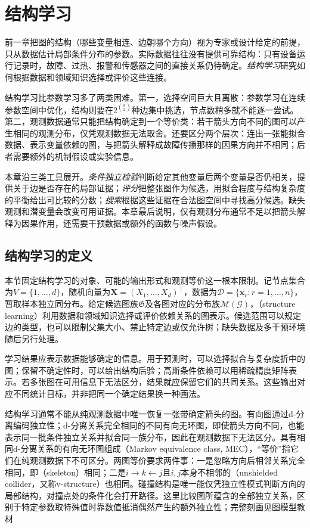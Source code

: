 \chapter{结构学习}
\label{chap:pgm-structure-learning}

前一章把图的结构（哪些变量相连、边朝哪个方向）视为专家或设计给定的前提，只从数据估计局部条件分布的参数。实际数据往往没有提供可靠结构：只有设备运行记录时，故障、过热、报警和传感器之间的直接关系仍待确定。\emph{结构学习}研究如何根据数据和领域知识选择或评价这些连接。

结构学习比参数学习多了两类困难。第一，选择空间巨大且离散：参数学习在连续参数空间中优化，结构则要在$2^{\binom d2}$种边集中挑选，节点数稍多就不能逐一尝试。第二，观测数据通常只能把结构确定到一个等价类：若干箭头方向不同的图可以产生相同的观测分布，仅凭观测数据无法取舍。还要区分两个层次：连出一张能拟合数据、表示变量依赖的图，与把箭头解释成故障传播那样的因果方向并不相同；后者需要额外的机制假设或实验信息。

本章沿三类工具展开。\emph{条件独立检验}判断给定其他变量后两个变量是否仍相关，提供关于边是否存在的局部证据；\emph{评分}把整张图作为候选，用拟合程度与结构复杂度的平衡给出可比较的分数；\emph{搜索}根据这些证据在合法图空间中寻找高分候选。缺失观测和潜变量会改变可用证据。本章最后说明，仅有观测分布通常不足以把箭头解释为因果作用，还需要干预数据或额外的函数与噪声假设。

\section{结构学习的定义}
\label{sec:pgm-structure-learning-definition}

本节固定结构学习的对象、可能的输出形式和观测等价这一根本限制。记节点集合为$V=\{1,\ldots,d\}$，随机向量为$\bm{X}=(X_1,\ldots,X_d)^{\top}$，数据为$\mathcal{D}=\{\bm{x}_r:r=1,\ldots,n\}$，暂取样本独立同分布。给定候选图族$\mathfrak{G}$及各图对应的分布族$\mathcal{M}(\mathcal{G})$，（structure learning）利用数据和领域知识选择或评价依赖关系的图表示。候选范围可以规定边的类型，也可以限制父集大小、禁止特定边或仅允许树；缺失数据及多干预环境随后另行处理。

学习结果应表示数据能够确定的信息。用于预测时，可以选择拟合与复杂度折中的图；保留不确定性时，可以给出结构后验；高斯条件依赖可以用稀疏精度矩阵表示。若多张图在可用信息下无法区分，结果就应保留它们的共同关系。这些输出对应不同统计目标，并非把同一个确定结果换一种画法。

结构学习通常不能从纯观测数据中唯一恢复一张带确定箭头的图。有向图通过d-分离编码独立性；d-分离关系完全相同的不同有向无环图，即使箭头方向不同，也能表示同一批条件独立关系并拟合同一族分布，因此在观测数据下无法区分。具有相同d-分离关系的有向无环图组成（Markov equivalence class, MEC），“等价”指它们在纯观测数据下不可区分。两图等价要求两件事：一是忽略方向后相邻关系完全相同，即（skeleton）相同；二是$i\to k\leftarrow j$且$i,j$本身不相邻的（unshielded collider，又称v-structure）也相同。碰撞结构是唯一能仅凭独立性模式判断方向的局部结构，对撞点处的条件化会打开路径。这里比较图所蕴含的全部独立关系，区别于特定参数取特殊值时靠数值抵消偶然产生的额外独立性；完整刻画见图模型教材

